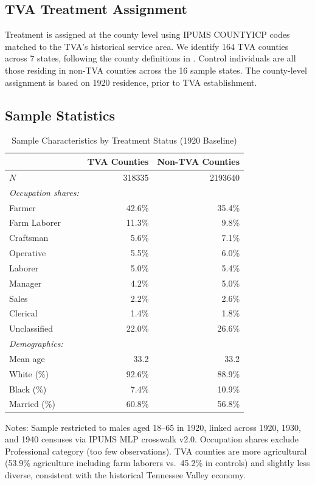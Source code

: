\documentclass[12pt]{article}
\begin{document}
\subsection{TVA Treatment Assignment}

Treatment is assigned at the county level using IPUMS COUNTYICP codes matched to the TVA's historical service area. We identify 164 TVA counties across 7 states, following the county definitions in \citet{kline2014}. Control individuals are all those residing in non-TVA counties across the 16 sample states. The county-level assignment is based on 1920 residence, prior to TVA establishment.

\subsection{Sample Statistics}

\begin{table}[H]
\centering
\caption{Sample Characteristics by Treatment Status (1920 Baseline)}
\label{tab:sample}
\begin{threeparttable}
\begin{tabular}{lrr}
\toprule
& TVA Counties & Non-TVA Counties \\
\midrule
$N$ & \num{318335} & \num{2193640} \\
\addlinespace
\textit{Occupation shares:} & & \\
\quad Farmer & 42.6\% & 35.4\% \\
\quad Farm Laborer & 11.3\% & 9.8\% \\
\quad Craftsman & 5.6\% & 7.1\% \\
\quad Operative & 5.5\% & 6.0\% \\
\quad Laborer & 5.0\% & 5.4\% \\
\quad Manager & 4.2\% & 5.0\% \\
\quad Sales & 2.2\% & 2.6\% \\
\quad Clerical & 1.4\% & 1.8\% \\
\quad Unclassified & 22.0\% & 26.6\% \\
\addlinespace
\textit{Demographics:} & & \\
\quad Mean age & 33.2 & 33.2 \\
\quad White (\%) & 92.6\% & 88.9\% \\
\quad Black (\%) & 7.4\% & 10.9\% \\
\quad Married (\%) & 60.8\% & 56.8\% \\
\bottomrule
\end{tabular}
\begin{tablenotes}[flushleft]
\small
\item Notes: Sample restricted to males aged 18--65 in 1920, linked across 1920, 1930, and 1940 censuses via IPUMS MLP crosswalk v2.0. Occupation shares exclude Professional category (too few observations). TVA counties are more agricultural (53.9\% agriculture including farm laborers vs.\ 45.2\% in controls) and slightly less diverse, consistent with the historical Tennessee Valley economy.
\end{tablenotes}
\end{threeparttable}
\end{table}
\end{document}
